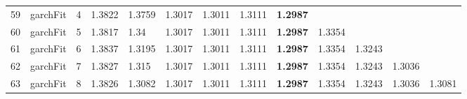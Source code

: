 \documentclass[10pt,a4paper]{article}
\begin{document}
\begin{table}[ht]
\begin{tabular}{rlrllllllllll}
  59 & garchFit &     4 & 1.3822 & 1.3759 & 1.3017 & 1.3011 & 1.3111 & \textbf{1.2987} &  &  &  &  \\ 
  60 & garchFit &     5 & 1.3817 & 1.34 & 1.3017 & 1.3011 & 1.3111 & \textbf{1.2987} & 1.3354 &  &  &  \\ 
  61 & garchFit &     6 & 1.3837 & 1.3195 & 1.3017 & 1.3011 & 1.3111 & \textbf{1.2987} & 1.3354 & 1.3243 &  &  \\ 
  62 & garchFit &     7 & 1.3827 & 1.315 & 1.3017 & 1.3011 & 1.3111 & \textbf{1.2987} & 1.3354 & 1.3243 & 1.3036 &  \\ 
  63 & garchFit &     8 & 1.3826 & 1.3082 & 1.3017 & 1.3011 & 1.3111 & \textbf{1.2987} & 1.3354 & 1.3243 & 1.3036 & 1.3081 \\ 
   \hline
\end{tabular}
\end{table}
\end{document}
